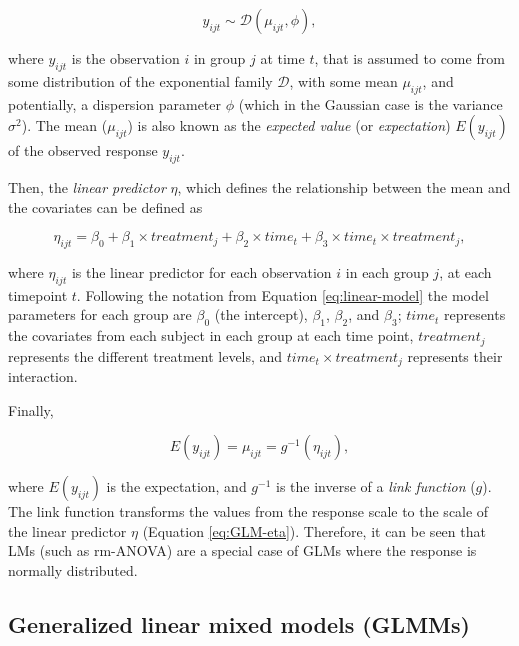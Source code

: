 \documentclass[
]{article}
\begin{document}
\begin{equation}
y_{ijt} \sim \mathcal{D}(\mu_{ijt},\phi),
\label{eq:GLM-y}
\end{equation}

where \(y_{ijt}\) is the observation \(i\) in group \(j\) at time \(t\), that is assumed to come from some distribution of the exponential family \(\mathcal{D}\), with some mean \(\mu_{ijt}\), and potentially, a dispersion parameter \(\phi\) (which in the Gaussian case is the variance \(\sigma^{2}\)). The mean (\(\mu_{ijt}\)) is also known as the \emph{expected value} (or \emph{expectation}) \(E(y_{ijt})\) of the observed response \(y_{ijt}\).

Then, the \emph{linear predictor} \(\eta\), which defines the relationship between the mean and the covariates can be defined as

\begin{equation}
\eta_{ijt}=\beta_0+\beta_1 \times treatment_{j} +\beta_2 \times time_{t} +\beta_3 \times time_{t}\times treatment_{j},
\label{eq:GLM-eta}
\end{equation}

where \(\eta_{ijt}\) is the linear predictor for each observation \(i\) in each group \(j\), at each timepoint \(t\). Following the notation from Equation \eqref{eq:linear-model} the model parameters for each group are \(\beta_0\) (the intercept), \(\beta_{1}\), \(\beta_2\), and \(\beta_3\); \(time_{t}\) represents the covariates from each subject in each group at each time point, \(treatment_j\) represents the different treatment levels, and \(time_t \times treatment_j\) represents their interaction.

Finally,

\begin{equation}
E(y_{ijt})=\mu_{ijt}=g^{-1}(\eta_{ijt}),
\label{eq:GLM-Expectation}
\end{equation}

where \(E(y_{ijt})\) is the expectation, and \(g^{-1}\) is the inverse of a \emph{link function} (\(g\)). The link function transforms the values from the response scale to the scale of the linear predictor \(\eta\) (Equation \eqref{eq:GLM-eta}). Therefore, it can be seen that LMs (such as rm-ANOVA) are a special case of GLMs where the response is normally distributed.

\hypertarget{generalized-linear-mixed-models-glmms}{%
\subsection{Generalized linear mixed models (GLMMs)}\label{generalized-linear-mixed-models-glmms}}
\end{document}
